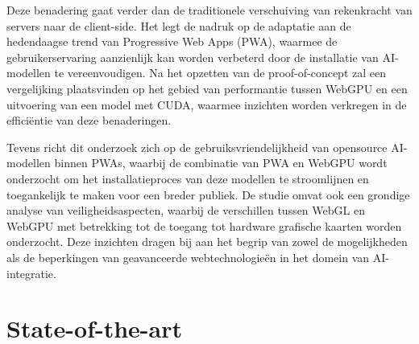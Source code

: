 \bigbreak

Deze benadering gaat verder dan de traditionele verschuiving van rekenkracht van servers naar de client-side. 
Het legt de nadruk op de adaptatie aan de hedendaagse trend van Progressive Web Apps (PWA), 
waarmee de gebruikerservaring aanzienlijk kan worden verbeterd door de installatie van AI-modellen te vereenvoudigen. 
Na het opzetten van de proof-of-concept zal een vergelijking plaatsvinden op het gebied van performantie tussen WebGPU en een uitvoering van een model met CUDA, 
waarmee inzichten worden verkregen in de efficiëntie van deze benaderingen.

\bigbreak

Tevens richt dit onderzoek zich op de gebruiksvriendelijkheid van opensource AI-modellen binnen PWAs, 
waarbij de combinatie van PWA en WebGPU wordt onderzocht om het installatieproces van deze modellen te stroomlijnen en toegankelijk te maken voor een breder publiek. 
De studie omvat ook een grondige analyse van veiligheidsaspecten, waarbij de verschillen tussen WebGL en WebGPU met betrekking tot de toegang tot hardware grafische kaarten worden onderzocht. 
Deze inzichten dragen bij aan het begrip van zowel de mogelijkheden als de beperkingen van geavanceerde webtechnologieën in het domein van AI-integratie.



\section{State-of-the-art}%
\label{sec:state-of-the-art}




